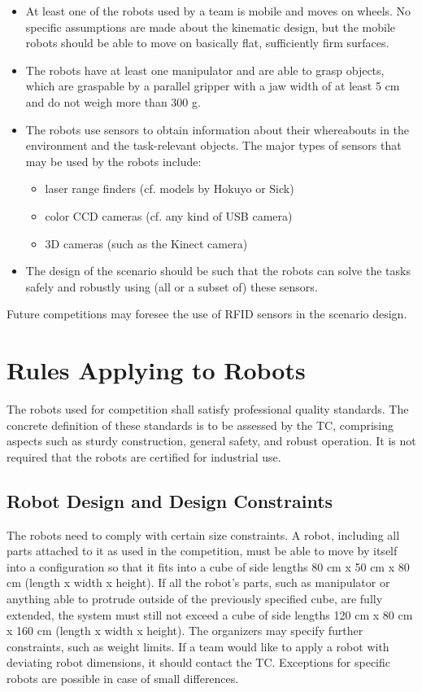 \begin{itemize}

	\item At least one of the robots used by a team is mobile and moves on wheels. No specific assumptions are made about the kinematic design, but the mobile robots should be able to move on basically flat, sufficiently firm surfaces.
	\item The robots have at least one manipulator and are able to grasp objects, which are graspable by a parallel gripper with a jaw width of at least 5 cm and do not weigh more than 300 g.
	\item The robots use sensors to obtain information about their whereabouts in the environment and the task-relevant objects. The major types of sensors that may be used by the robots include:
	\begin{itemize}
		\item laser range finders (cf. models by Hokuyo or Sick)
		\item color CCD cameras (cf. any kind of USB camera)
		\item 3D cameras (such as the Kinect camera)
	\end{itemize}

	\item The design of the scenario should be such that the robots can solve the 	tasks safely and robustly using (all or a subset of) these sensors.

\end{itemize}



Future competitions may foresee the use of RFID sensors in the scenario design.


\section{Rules Applying to Robots} \label{sec:Robots}
The robots used for competition shall satisfy professional quality standards. The concrete definition of these standards is to be assessed by the TC, comprising aspects such as sturdy construction, general safety, and robust operation. It is not required that the robots are certified for industrial use.

\subsection{Robot Design and Design Constraints} \label{ssec:RobotDesignAndConstraints}
The robots need to comply with certain size constraints. A robot, including all parts attached to it as used in the competition, must be able to move by itself into a configuration so that it fits into a cube of side lengths 80 cm x 50 cm x 80 cm (length x width x height). If all the robot's parts, such as manipulator or anything able to protrude outside of the previously specified cube, are fully extended, the system must still not exceed a cube of side lengths 120 cm x 80 cm x 160 cm (length x width x height). The organizers may specify further constraints, such as weight limits. If a team would like to apply a robot with deviating robot dimensions, it should contact the TC. Exceptions for specific robots are possible in case of small differences.

